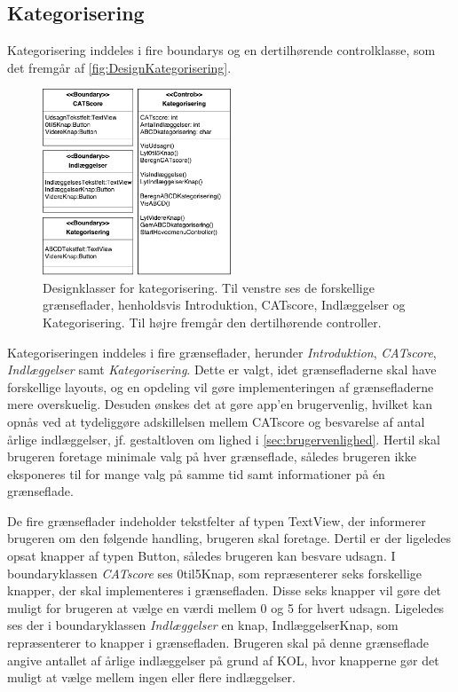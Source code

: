 \subsection*{Kategorisering}
Kategorisering inddeles i fire boundarys og en dertilhørende controlklasse, som det fremgår af \autoref{fig:DesignKategorisering}.

\begin{figure} [H]
\centering
\includegraphics[width=0.5\textwidth]{figures/MVC/MVCKategorisering}
\caption{Designklasser for kategorisering. Til venstre ses de forskellige grænseflader, henholdsvis Introduktion, CATscore, Indlæggelser og Kategorisering. Til højre fremgår den dertilhørende controller.}
\label{fig:DesignKategorisering}
\end{figure}

\noindent
Kategoriseringen inddeles i fire grænseflader, herunder \textit{Introduktion}, \textit{CATscore}, \textit{Indlæggelser} samt \textit{Kategorisering}. Dette er valgt, idet grænsefladerne skal have forskellige layouts, og en opdeling vil gøre implementeringen af grænsefladerne mere overskuelig. Desuden ønskes det at gøre app’en brugervenlig, hvilket kan opnås ved at tydeliggøre adskillelsen mellem CATscore og besvarelse af antal årlige indlæggelser, jf. gestaltloven om lighed i \autoref{sec:brugervenlighed}. Hertil skal brugeren foretage minimale valg på hver grænseflade, således
brugeren ikke eksponeres til for mange valg på samme tid samt informationer på én grænseflade.

De fire grænseflader indeholder tekstfelter af typen TextView, der informerer brugeren om den følgende handling, brugeren skal foretage. Dertil er der ligeledes opsat knapper af typen Button, således brugeren kan besvare udsagn. I boundaryklassen \textit{CATscore} ses 0til5Knap, som repræsenterer seks forskellige knapper, der skal implementeres i grænsefladen. Disse seks knapper vil gøre det muligt for brugeren at vælge en værdi mellem 0 og 5 for hvert udsagn. Ligeledes ses der i boundaryklassen \textit{Indlæggelser} en knap, IndlæggelserKnap, som repræsenterer to knapper i grænsefladen. Brugeren skal på denne grænseflade angive antallet af årlige indlæggelser på grund af KOL, hvor knapperne gør det muligt at vælge mellem ingen eller flere indlæggelser.

